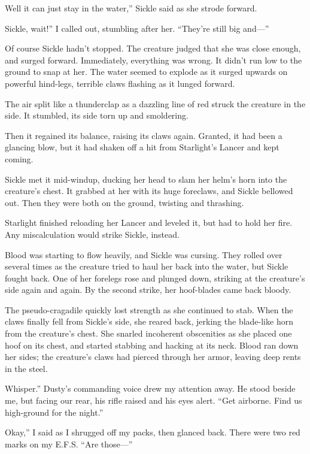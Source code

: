 \leavevmode{}Well it can just stay in the water,” Sickle said as she strode forward.

\leavevmode{}Sickle, wait!” I called out, stumbling after her. “They’re still big and—”

Of course Sickle hadn’t stopped. The creature judged that she was close enough, and surged forward. Immediately, everything was wrong. It didn’t run low to the ground to snap at her. The water seemed to explode as it surged upwards on powerful hind-legs, terrible claws flashing as it lunged forward.

The air split like a thunderclap as a dazzling line of red struck the creature in the side. It stumbled, its side torn up and smoldering.

Then it regained its balance, raising its claws again. Granted, it had been a glancing blow, but it had shaken off a hit from Starlight’s Lancer and kept coming.

Sickle met it mid-windup, ducking her head to slam her helm’s horn into the creature’s chest. It grabbed at her with its huge foreclaws, and Sickle bellowed out. Then they were both on the ground, twisting and thrashing.

Starlight finished reloading her Lancer and leveled it, but had to hold her fire. Any miscalculation would strike Sickle, instead.

Blood was starting to flow heavily, and Sickle was cursing. They rolled over several times as the creature tried to haul her back into the water, but Sickle fought back. One of her forelegs rose and plunged down, striking at the creature’s side again and again. By the second strike, her hoof-blades came back bloody.

The pseudo-cragadile quickly lost strength as she continued to stab. When the claws finally fell from Sickle’s side, she reared back, jerking the blade-like horn from the creature’s chest. She snarled incoherent obscenities as she placed one hoof on its chest, and started stabbing and hacking at its neck. Blood ran down her sides; the creature’s claws had pierced through her armor, leaving deep rents in the steel.

\leavevmode{}Whisper.” Dusty’s commanding voice drew my attention away. He stood beside me, but facing our rear, his rifle raised and his eyes alert. “Get airborne. Find us high-ground for the night.”

\leavevmode{}Okay,” I said as I shrugged off my packs, then glanced back. There were two red marks on my E.F.S. “Are those—”

